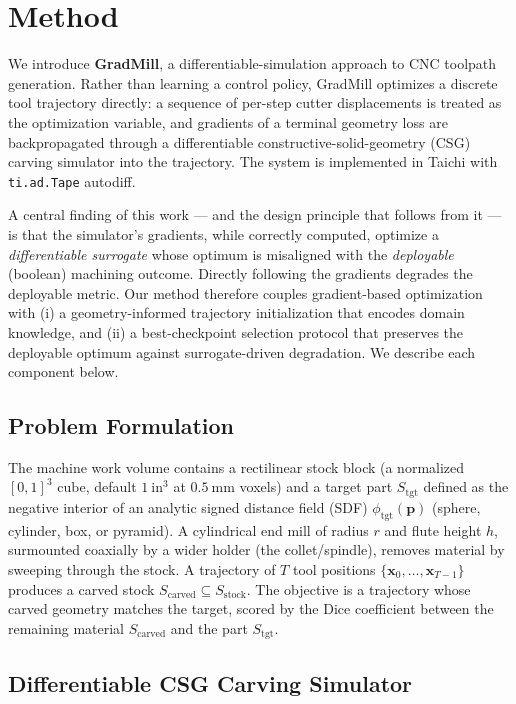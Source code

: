 \section{Method}
\label{sec:method}

We introduce \textbf{GradMill}, a differentiable-simulation approach to CNC
toolpath generation. Rather than learning a control policy, GradMill optimizes a
discrete tool trajectory directly: a sequence of per-step cutter displacements
is treated as the optimization variable, and gradients of a terminal geometry
loss are backpropagated through a differentiable constructive-solid-geometry
(CSG) carving simulator into the trajectory. The system is implemented in Taichi
with \texttt{ti.ad.Tape} autodiff.

A central finding of this work --- and the design principle that follows from it
--- is that the simulator's gradients, while correctly computed, optimize a
\emph{differentiable surrogate} whose optimum is misaligned with the
\emph{deployable} (boolean) machining outcome. Directly following the gradients
degrades the deployable metric. Our method therefore couples gradient-based
optimization with (i) a geometry-informed trajectory initialization that
encodes domain knowledge, and (ii) a best-checkpoint selection protocol that
preserves the deployable optimum against surrogate-driven degradation. We
describe each component below.

\subsection{Problem Formulation}
\label{sec:problem}

The machine work volume contains a rectilinear stock block (a normalized
$[0,1]^3$ cube, default $1~\mathrm{in}^3$ at $0.5~\mathrm{mm}$ voxels) and a
target part $S_{\mathrm{tgt}}$ defined as the negative interior of an analytic
signed distance field (SDF) $\phi_{\mathrm{tgt}}(\mathbf{p})$ (sphere, cylinder,
box, or pyramid). A cylindrical end mill of radius $r$ and flute height $h$,
surmounted coaxially by a wider holder (the collet/spindle), removes material by
sweeping through the stock. A trajectory of $T$ tool positions
$\{\mathbf{x}_0, \dots, \mathbf{x}_{T-1}\}$ produces a carved stock
$S_{\mathrm{carved}} \subseteq S_{\mathrm{stock}}$. The objective is a trajectory
whose carved geometry matches the target, scored by the Dice coefficient between
the remaining material $S_{\mathrm{carved}}$ and the part $S_{\mathrm{tgt}}$.

\subsection{Differentiable CSG Carving Simulator}
\label{sec:simulator}

